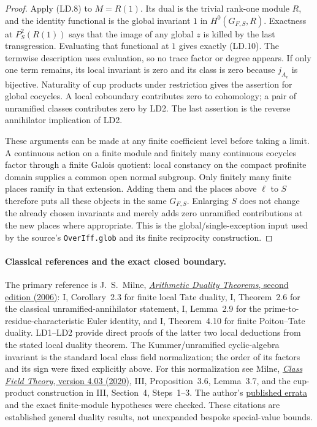 \begin{proof}
Apply (LD.8) to $M=R(1)$.  Its dual is the trivial rank-one module
$R$, and the identity functional is the global invariant $1$ in
$H^0(G_{F,S},R)$.  Exactness at $P^2_S(R(1))$ says that the image of
any global $z$ is killed by the last transgression.  Evaluating that
functional at $1$ gives exactly (LD.10).  The termwise description
uses evaluation, so no trace factor or degree appears.  If only
one term remains, its local invariant is zero and its class is
zero because $j_{A_v}$ is bijective.  Naturality of cup products
under restriction gives the assertion for global cocycles.  A local
coboundary contributes zero to cohomology; a pair of unramified
classes contributes zero by LD2.  The last assertion is the reverse
annihilator implication of LD2.

These arguments can be made at any finite coefficient level before
taking a limit.  A continuous action on a finite module and finitely
many continuous cocycles factor through a finite Galois quotient:
local constancy on the compact profinite domain supplies a common
open normal subgroup.  Only finitely many finite places ramify in
that extension.  Adding them and the places above $\ell$ to $S$
therefore puts all these objects in the same $G_{F,S}$.  Enlarging
$S$ does not change the already chosen invariants and merely adds
zero unramified contributions at the new places where appropriate.
This is the global/single-exception input used by the source's
\texttt{OverIff.glob} and its finite reciprocity construction.
\end{proof}

\paragraph{Classical references and the exact closed boundary.}
The primary reference is J.~S.~Milne,
\href{https://jmilne.org/math/Books/ADTnot.pdf}{\emph{Arithmetic Duality
Theorems}, second edition (2006)}: I, Corollary~2.3 for finite local
Tate duality, I, Theorem~2.6 for the classical unramified-annihilator
statement, I, Lemma~2.9 for the prime-to-residue-characteristic Euler
identity, and I, Theorem~4.10 for finite Poitou--Tate duality.
LD1--LD2 provide direct proofs of the latter two local deductions
from the stated local duality theorem.  The Kummer/unramified
cyclic-algebra invariant is the standard local class field
normalization; the order of its factors and its sign were fixed
explicitly above.  For this normalization see Milne,
\href{https://www.jmilne.org/math/CourseNotes/CFT.pdf}{\emph{Class Field
Theory}, version 4.03 (2020)}, III, Proposition~3.6, Lemma~3.7,
and the cup-product construction in III, Section~4, Steps~1--3.
The author's
\href{https://www.jmilne.org/math/Books/add/ADT2006.pdf}{published
errata} and the exact finite-module hypotheses were checked.
These citations are established general duality results, not
unexpanded bespoke special-value bounds.

